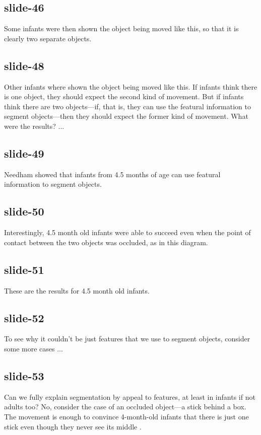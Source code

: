 \documentclass[12pt,\papersize]{extarticle}
\begin{document}
 
\subsection{slide-46}
Some infants were then shown the object being moved like this, so that it is clearly two separate objects.
 
 
\subsection{slide-48}
Other infants where shown the object being moved like this.
If infants think there is one object, they should expect the second kind of movement.
But if infants think there are two objects---if, that is, they can use the featural information to segment objects---then they should expect the former kind of movement.
What were the results? ...
 
 
\subsection{slide-49}
Needham showed that infants from 4.5 months of age can use featural information to segment objects.
 
 
\subsection{slide-50}
Interestingly, 4.5 month old infants were able to succeed even when the point of contact between the two objects was occluded, as in this diagram.
 
 
\subsection{slide-51}
These are the results for 4.5 month old infants.
 
 
\subsection{slide-52}
To see why it couldn't be just features that we use to segment objects, consider some more cases ...
 
 
\subsection{slide-53}
Can we fully explain segmentation by appeal to features, at least in infants if not adults too?
No, consider the case of an occluded object---a stick behind a box.
The movement is enough to convince 4-month-old infants that there is just one stick even though they never see its middle \citep{kellman:1983_perception}.
 
\end{document}
